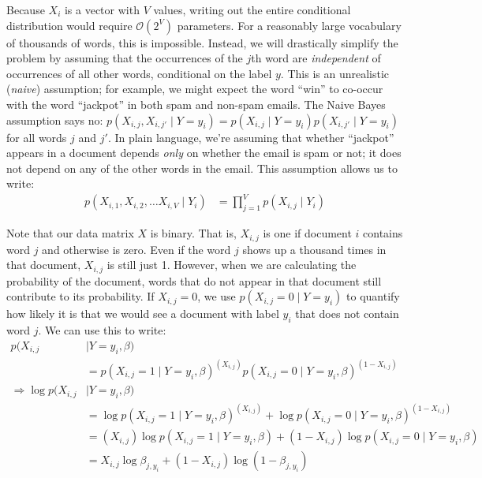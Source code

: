 \documentclass[12pt]{article}
\begin{document}
Because $X_i$ is a vector with $V$ values, writing out the entire conditional
distribution would require ${\mathcal O}(2^V)$ parameters. For a reasonably
large vocabulary of thousands of words, this is impossible. Instead, we will
drastically simplify the problem by assuming that the occurrences of the $j$th
word are {\it independent} of occurrences of all other words, conditional on
the label $y$. This is an unrealistic ({\it naive}) assumption; for example, we
might expect the word ``win'' to co-occur with the word ``jackpot'' in both
spam and non-spam emails. The Naive Bayes assumption says no: $p(X_{i, j},
X_{i, j'} \mid Y=y_i) = p(X_{i, j} \mid Y=y_i)p(X_{i, j'} \mid Y=y_i)$ for all
words $j$ and $j'$. In plain language, we're assuming that whether ``jackpot''
appears in a document depends {\it only} on whether the email is spam or not;
it does not depend on any of the other words in the email. This assumption
allows us to write:
\begin{align}
p(X_{i, 1}, X_{i, 2}, \ldots X_{i, V} \mid Y_i)
&= \prod_{j=1}^V p(X_{i, j} \mid Y_i) \label{eq:naive_assumption}
\end{align}

Note that our data matrix $X$ is binary. That is, $X_{i, j}$ is one if document
$i$ contains word $j$ and otherwise is zero. Even if the word $j$ shows up a
thousand times in that document, $X_{i, j}$ is still just 1. However, when we
are calculating the probability of the document, words that do not appear in
that document still contribute to its probability. If $X_{i, j} = 0$, we use
$p(X_{i, j} = 0 \mid Y=y_i)$ to quantify how likely it is that we would see a
document with label $y_i$ that does not contain word $j$. We can use this to write:
\begin{align}
p(X_{i, j} &\mid Y=y_i, \beta) \nonumber \\
&=p(X_{i, j}=1 \mid Y=y_i, \beta)^{(X_{i,j})}p(X_{i, j}=0 \mid Y=y_i, \beta)^{(1 - X_{i,j})} \\
\Rightarrow \log p(X_{i, j} &\mid Y=y_i, \beta) \nonumber \\
&=\log p(X_{i, j}=1 \mid Y=y_i, \beta)^{(X_{i,j})} + \log p(X_{i, j}=0 \mid Y=y_i, \beta)^{(1 - X_{i,j})} \nonumber \\
&= (X_{i, j}) \log p(X_{i, j}=1 \mid Y=y_i, \beta) + (1 - X_{i, j}) \log p(X_{i, j}=0 \mid Y=y_i, \beta) \nonumber \\
&= X_{i, j} \log \beta_{j, y_i} + (1 - X_{i, j}) \log (1 - \beta_{j, y_i}) \label{eq:prob_one_word}
\end{align}
\end{document}
